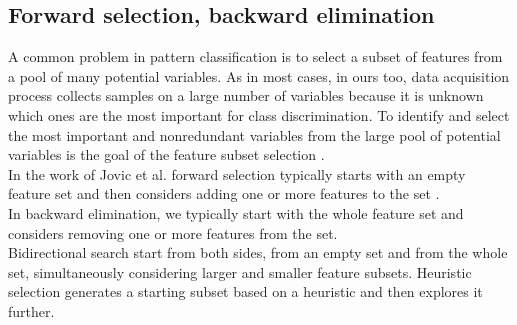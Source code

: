 \subsection{Forward selection, backward elimination}
A common problem in pattern classification is to select a subset of features from a pool of many potential variables. As in most cases, in ours too, data acquisition process collects samples on a large number of variables because it is unknown which ones are the most important for class discrimination. To identify and select the most important and nonredundant variables from the large pool of potential variables is the goal of the feature subset selection \cite{mao_orthogonal_2004}.\\
In the work of Jovic et al. forward selection typically starts with an empty feature set and then considers adding one or more features to the set \cite{jovic_review_2015}.\\
In backward elimination, we typically start with the whole feature set and considers removing one or more features from the set.\\
Bidirectional search start from both sides, from an empty set and from the whole set, simultaneously considering larger and smaller feature subsets. Heuristic selection generates a starting subset based on a heuristic and then explores it further.\\
